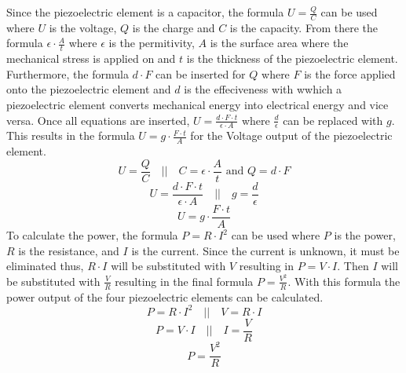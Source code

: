 Since the piezoelectric element is a capacitor, the formula $U=\frac{Q}{C}$ can be used where $U$ is the voltage, $Q$ is the charge and $C$ is the capacity. From there the formula $\epsilon \cdot \frac{A}{t}$ where $\epsilon$ is the permitivity, $A$ is the surface area where the mechanical stress is applied on and $t$ is the thickness of the piezoelectric element. Furthermore, the formula $d \cdot F$ can be inserted for $Q$ where $F$ is the force applied onto the piezoelectric element and $d$ is the effeciveness with wwhich a piezoelectric element converts mechanical energy into electrical energy and vice versa. Once all equations are inserted, $U=\frac{d \cdot F \cdot t}{\epsilon \cdot A}$ where $\frac{d}{\epsilon}$ can be replaced with $g$. This results in the formula $U = g \cdot \frac{F \cdot t}{A}$ for the Voltage output of the piezoelectric element.
$$
U = \frac{Q}{C} \quad || \quad C = \epsilon \cdot \frac{A}{t} \text{ and } Q = d \cdot F
$$
$$
U = \frac{d \cdot F \cdot t}{\epsilon \cdot A} \quad || \quad g = \frac{d}{\epsilon}
$$
$$
U = g \cdot \frac{F \cdot t}{A}
$$
To calculate the power, the formula $P = R \cdot I^2$ can be used where $P$ is the power, $R$ is the resistance, and $I$ is the current. Since the current is unknown, it must be eliminated thus, $R \cdot I$ will be substituted with $V$ resulting in $P = V \cdot I$. Then $I$ will be substituted with $\frac{V}{R}$ resulting in the final formula $P = \frac{V^2}{R}$. With this formula the power output of the four piezoelectric elements can be calculated.
$$
P = R \cdot I^2 \quad || \quad V = R \cdot I
$$
$$
P = V \cdot I \quad || \quad I = \frac{V}{R} 
$$
$$
P = \frac{V^2}{R}
$$